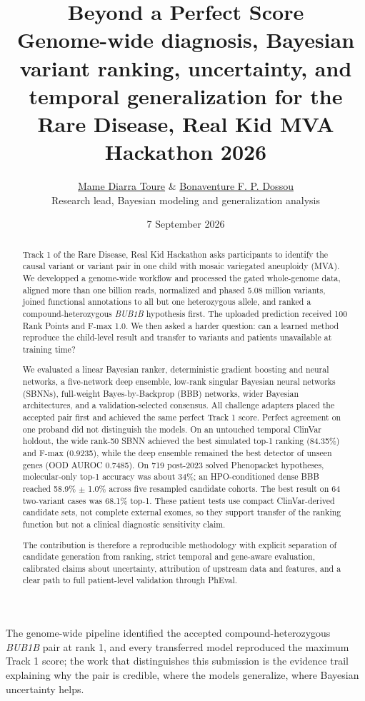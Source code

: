 \documentclass[11pt]{article}
\title{\textbf{Beyond a Perfect Score}\\[0.35em]
\large Genome-wide diagnosis, Bayesian variant ranking, uncertainty, and temporal generalization for the Rare Disease, Real Kid MVA Hackathon 2026}
\author{\href{https://arradiat.github.io}{Mame Diarra Toure} \& \href{https://bonaventuredossou.github.io}{Bonaventure F. P. Dossou}\\[0.3em]\small Research lead, Bayesian modeling and generalization analysis}
\date{7 September 2026}
\begin{document}
\maketitle

\begin{tcolorbox}[colback=light,colframe=navy,title=TL;DR]
The genome-wide pipeline identified the accepted compound-heterozygous \textit{BUB1B} pair at rank 1, and every transferred model reproduced the maximum Track 1 score; the work that distinguishes this submission is the evidence trail explaining why the pair is credible, where the models generalize, where Bayesian uncertainty helps.
\end{tcolorbox}

\begin{abstract}
Track 1 of the Rare Disease, Real Kid Hackathon asks participants to identify the causal variant or variant pair in one child with mosaic variegated aneuploidy (MVA). We developped a genome-wide workflow and processed the gated whole-genome data, aligned more than one billion reads, normalized and phased 5.08 million variants, joined functional annotations to all but one heterozygous allele, and ranked a compound-heterozygous \textit{BUB1B} hypothesis first. The uploaded prediction received 100 Rank Points and F-max 1.0. We then asked a harder question: can a learned method reproduce the child-level result and transfer to variants and patients unavailable at training time?

We evaluated a linear Bayesian ranker, deterministic gradient boosting and neural networks, a five-network deep ensemble, low-rank singular Bayesian neural networks (SBNNs), full-weight Bayes-by-Backprop (BBB) networks, wider Bayesian architectures, and a validation-selected consensus. All challenge adapters placed the accepted pair first and achieved the same perfect Track 1 score. Perfect agreement on one proband did not distinguish the models. On an untouched temporal ClinVar holdout, the wide rank-50 SBNN achieved the best simulated top-1 ranking (84.35\%) and F-max (0.9235), while the deep ensemble remained the best detector of unseen genes (OOD AUROC 0.7485). On 719 post-2023 solved Phenopacket hypotheses, molecular-only top-1 accuracy was about 34\%; an HPO-conditioned dense BBB reached 58.9\% $\pm$ 1.0\% across five resampled candidate cohorts. The best result on 64 two-variant cases was 68.1\% top-1. These patient tests use compact ClinVar-derived candidate sets, not complete external exomes, so they support transfer of the ranking function but not a clinical diagnostic sensitivity claim.

The contribution is therefore a reproducible methodology with explicit separation of candidate generation from ranking, strict temporal and gene-aware evaluation, calibrated claims about uncertainty, attribution of upstream data and features, and a clear path to full patient-level validation through PhEval.
\end{abstract}
\end{document}
